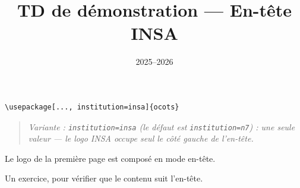 \documentclass[11pt]{ocots-td}
\title{TD de démonstration — En-tête INSA}
\date{2025--2026}
\newcommand{\ocotsvariantnote}[1]{\begin{quote}\itshape Variante : #1\end{quote}}
\begin{document}
\maketitle

\begin{lstlisting}
\usepackage[..., institution=insa]{ocots}
\end{lstlisting}
\ocotsvariantnote{\texttt{institution=insa} (le défaut est
\texttt{institution=n7}) : une seule valeur — le logo INSA occupe seul le
côté gauche de l'en-tête.}

\begin{instructions}
    Le logo de la première page est composé en mode en-tête.
\end{instructions}

\begin{exercise}[points=2]
    Un exercice, pour vérifier que le contenu suit l'en-tête.
\end{exercise}
\end{document}
